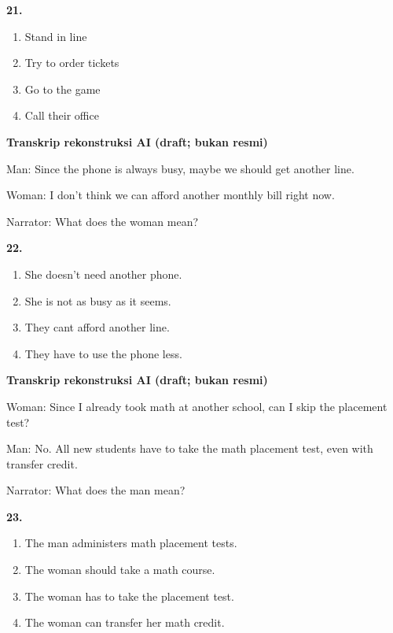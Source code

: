 \documentclass[12pt]{article}
\begin{document}
\noindent\textbf{21.}
\begin{enumerate}[label=(\Alph*),leftmargin=*,itemsep=0.2em]
\item Stand in line
\item Try to order tickets
\item Go to the game
\item Call their office
\end{enumerate}
\par
\vspace{0.25\baselineskip}
\begin{exampleblock}
\textbf{Transkrip rekonstruksi AI (draft; bukan resmi)}\par
Man: Since the phone is always busy, maybe we should get another line.\par
Woman: I don't think we can afford another monthly bill right now.\par
Narrator: What does the woman mean?\par
\end{exampleblock}
\noindent\textbf{22.}
\begin{enumerate}[label=(\Alph*),leftmargin=*,itemsep=0.2em]
\item She doesn't need another phone.
\item She is not as busy as it seems.
\item They cant afford another line.
\item They have to use the phone less.
\end{enumerate}
\par
\vspace{0.25\baselineskip}
\begin{exampleblock}
\textbf{Transkrip rekonstruksi AI (draft; bukan resmi)}\par
Woman: Since I already took math at another school, can I skip the placement test?\par
Man: No. All new students have to take the math placement test, even with transfer credit.\par
Narrator: What does the man mean?\par
\end{exampleblock}
\noindent\textbf{23.}
\begin{enumerate}[label=(\Alph*),leftmargin=*,itemsep=0.2em]
\item The man administers math placement tests.
\item The woman should take a math course.
\item The woman has to take the placement test.
\item The woman can transfer her math credit.
\end{enumerate}
\end{document}
